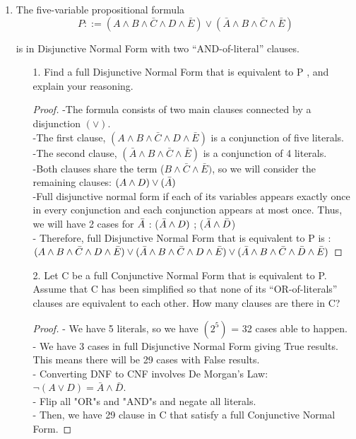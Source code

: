 \documentclass[11pt]{article}
\begin{document}
\begin{enumerate}
\newpage
\item The five-variable propositional formula
  \[P ::=(A \land B \land \bar{C} \land D \land \bar{E}) \lor (\bar{A} \land B \land \bar{C} \land \bar{E})\]

  is in Disjunctive Normal Form with two ``AND-of-literal'' clauses.
  \begin{enumerate}

  \item[1.] Find a full Disjunctive Normal Form that is equivalent to P , and explain your reasoning.\\
  \begin{proof}
      -The formula consists of two main clauses connected by a disjunction $(\lor)$.\\
      -The first clause, $(A \land B \land \bar{C} \land D \land \bar{E})$ is a conjunction of five literals.\\
      -The second clause, $(\bar{A} \land B \land \bar{C} \land \bar{E})$ is a conjunction of 4 literals.\\
      -Both clauses share the term ($B \land \bar{C} \land \bar{E})$, so we will consider the remaining clauses: $(A \land D) \lor (\Bar{A})$\\
      -Full disjunctive normal form if each of its variables appears exactly once in every conjunction and each conjunction appears at most once. Thus, we will have 2 cases for $\Bar{A}$ : ($\Bar{A} \land D)$ ; ($\Bar{A} \land \Bar{D}$)\\
      - Therefore, full Disjunctive Normal Form that is equivalent to P is :\\
      
        $(A \land B \land \bar{C} \land D \land \bar{E}) \lor (\Bar{A} \land B \land \bar{C} \land D \land \bar{E}) \lor (\Bar{A} \land B \land \bar{C} \land \Bar{D} \land \bar{E})$
  \end{proof}
  \item[2.] Let C be a full Conjunctive Normal Form that is equivalent to P. Assume that C has been simplified so that none of its “OR-of-literals” clauses are equivalent to each other. How many clauses are there in C?\\
  \begin{proof}
    - We have 5 literals, so we have $(2^5)$ = 32 cases able to happen.\\
    - We have 3 cases in full Disjunctive Normal Form giving True results. This means there will be 29 cases with False results.\\
    - Converting DNF to CNF involves De Morgan's Law: $\neg(A \lor D) = \bar{A} \land \bar{D}$.\\
    - Flip all "OR"s and "AND"s and negate all literals.\\
    - Then, we have 29 clause in C that satisfy a full Conjunctive Normal Form.
    

\end{proof}
\end{enumerate}
\end{enumerate}
\end{document}

